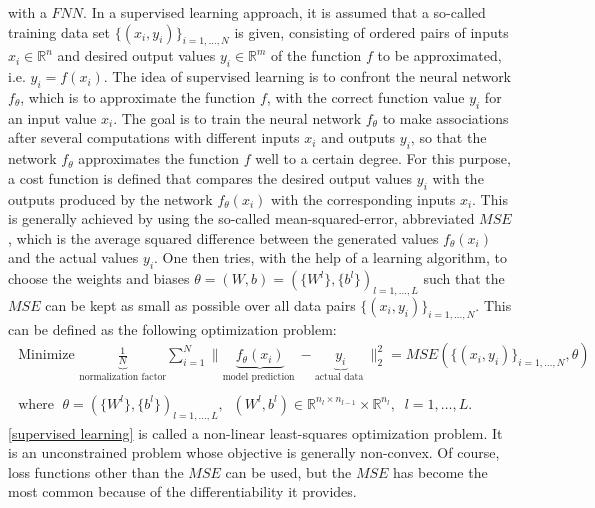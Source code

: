 with a $FNN$. In a supervised learning approach, it is assumed that a so-called training data set $\{ (x_i, y_i) \}_{i = 1, \ldots, N}$ is given, consisting of ordered pairs of inputs $x_i \in \mathbb{R}^n$ and desired output values $y_i \in \mathbb{R}^m$ of the function $f$ to be approximated, i.e. $y_i = f(x_i)$. The idea of supervised learning is to confront the neural network $f_{\theta}$, which is to approximate the function $f$, with the correct function value $y_i$ for an input value $x_i$. The goal is to train the neural network $f_{\theta}$ to make associations after several computations with different inputs $x_i$ and outputs $y_i$, so that the network $f_{\theta}$ approximates the function $f$ well to a certain degree. For this purpose, a cost function is defined that compares the desired output values $y_i$ with the outputs produced by the network $f_{\theta}(x_i)$ with the corresponding inputs $x_i$. This is generally achieved by using the so-called mean-squared-error, abbreviated $MSE$, which is the average squared difference between the generated values $f_{\theta}(x_i)$ and the actual values $y_i$. One then tries, with the help of a learning algorithm, to choose the weights and biases $\theta = (W, b) = (\{ W^l \}, \{ b^l \})_{l = 1, \ldots, L}$ such that the $MSE$ can be kept as small as possible over all data pairs $\{ (x_i, y_i) \}_{i = 1, \ldots, N}$. This can be defined as the following optimization problem:
\begin{equation}
    \label{supervised learning}
    \begin{gathered}
        \text{ Minimize } \underbrace{\frac{1}{N}}_{\text{normalization factor}} \sum_{i=1}^{N} \lVert \underbrace{ f_{\theta} \left(x_{i}\right)}_{\text{model prediction }} - \underbrace{y_{i}}_{\text{actual data }} \rVert^{2}_2 =  MSE(\{ (x_i, y_i) \}_{i = 1, \ldots, N}, \theta) \\
        \\
        \text{ where } \; \theta = (\{ W^l \}, \{ b^l \})_{l = 1, \ldots, L}, \; \; \left(W^{l}, b^{l}\right) \in \mathbb{R}^{n_l \times n_{l-1}} \times \mathbb{R}^{n_l}, \; \; l=1, \ldots, L .
    \end{gathered}
\end{equation}
\cref{supervised learning} is called a non-linear least-squares optimization problem. It is an unconstrained problem whose objective is generally non-convex. Of course, loss functions other than the $MSE$ can be used, but the $MSE$ has become the most common because of the differentiability it provides. \\
